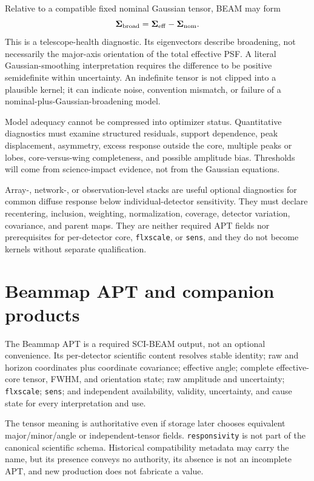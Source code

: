 \documentclass[11pt]{article}
\begin{document}
Relative to a compatible fixed nominal Gaussian tensor, BEAM may form
\begin{equation}
\boldsymbol\Sigma_{\rm broad}=
\boldsymbol\Sigma_{\rm eff}-\boldsymbol\Sigma_{\rm nom}.
\label{eq:rationale-broad}
\end{equation}
This is a telescope-health diagnostic. Its eigenvectors describe broadening,
not necessarily the major-axis orientation of the total effective PSF. A
literal Gaussian-smoothing interpretation requires the difference to be
positive semidefinite within uncertainty. An indefinite tensor is not clipped
into a plausible kernel; it can indicate noise, convention mismatch, or
failure of a nominal-plus-Gaussian-broadening model.

Model adequacy cannot be compressed into optimizer status. Quantitative
diagnostics must examine structured residuals, support dependence, peak
displacement, asymmetry, excess response outside the core, multiple peaks or
lobes, core-versus-wing completeness, and possible amplitude bias. Thresholds
will come from science-impact evidence, not from the Gaussian equations.

Array-, network-, or observation-level stacks are useful optional diagnostics
for common diffuse response below individual-detector sensitivity. They must
declare recentering, inclusion, weighting, normalization, coverage, detector
variation, covariance, and parent maps. They are neither required APT fields
nor prerequisites for per-detector core, \texttt{flxscale}, or \texttt{sens},
and they do not become kernels without separate qualification.

\section{Beammap APT and companion products}
\label{sec:apt}

The Beammap APT is a required SCI-BEAM output, not an optional convenience.
Its per-detector scientific content resolves stable identity; raw and horizon
coordinates plus coordinate covariance; effective angle; complete effective-
core tensor, FWHM, and orientation state; raw amplitude and uncertainty;
\texttt{flxscale}; \texttt{sens}; and independent availability, validity,
uncertainty, and cause state for every interpretation and use.

The tensor meaning is authoritative even if storage later chooses equivalent
major/minor/angle or independent-tensor fields. \texttt{responsivity} is not
part of the canonical scientific schema. Historical compatibility metadata
may carry the name, but its presence conveys no authority, its absence is not
an incomplete APT, and new production does not fabricate a value.
\end{document}

